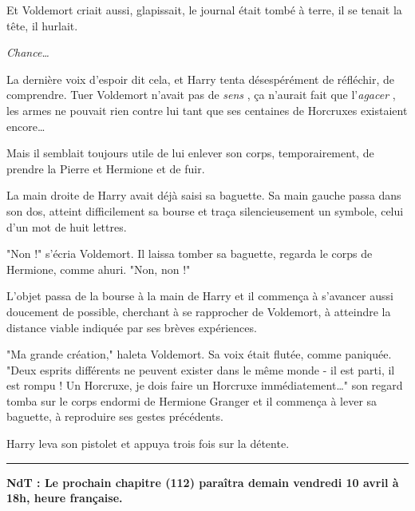 Et Voldemort criait aussi, glapissait, le journal était tombé à terre, il se tenait la tête, il hurlait.

\emph{Chance…} 

La dernière voix d'espoir dit cela, et Harry tenta désespérément de réfléchir, de comprendre. Tuer Voldemort n'avait pas de \emph{sens} , ça n'aurait fait que l'\emph{agacer} , les armes ne pouvait rien contre lui tant que ses centaines de Horcruxes existaient encore…

Mais il semblait toujours utile de lui enlever son corps, temporairement, de prendre la Pierre et Hermione et de fuir.

La main droite de Harry avait déjà saisi sa baguette. Sa main gauche passa dans son dos, atteint difficilement sa bourse et traça silencieusement un symbole, celui d'un mot de huit lettres.

"Non !" s'écria Voldemort. Il laissa tomber sa baguette, regarda le corps de Hermione, comme ahuri. "Non, non !"

L'objet passa de la bourse à la main de Harry et il commença à s'avancer aussi doucement de possible, cherchant à se rapprocher de Voldemort, à atteindre la distance viable indiquée par ses brèves expériences.

"Ma grande création," haleta Voldemort. Sa voix était flutée, comme paniquée. "Deux esprits différents ne peuvent exister dans le même monde - il est parti, il est rompu ! Un Horcruxe, je dois faire un Horcruxe immédiatement…" son regard tomba sur le corps endormi de Hermione Granger et il commença à lever sa baguette, à reproduire ses gestes précédents.

Harry leva son pistolet et appuya trois fois sur la détente.
\par\noindent\rule{\textwidth}{0.4pt}
\textbf{NdT : Le prochain chapitre (112) paraîtra demain vendredi 10 avril à 18h, heure française.} 

